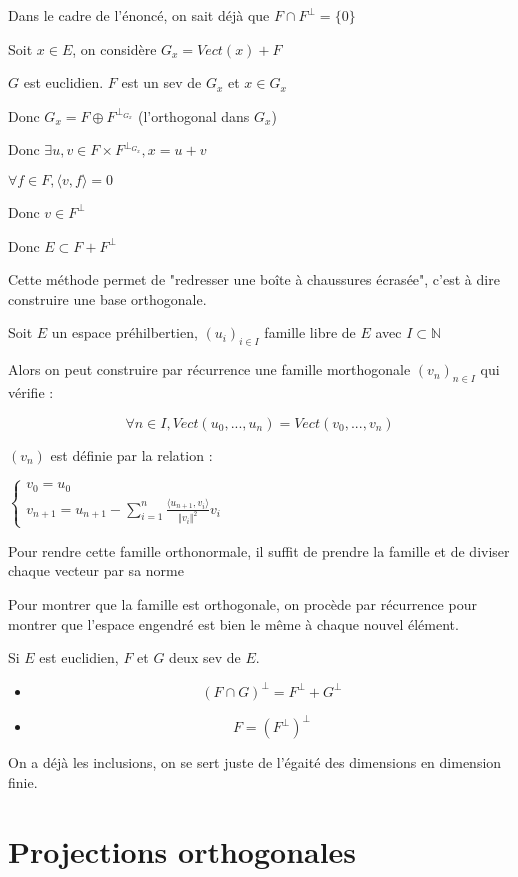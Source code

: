 \documentclass[a4paper,12pt]{book}
\newcommand{\Thr}[2]{\begin{tcolorbox}[sharp corners, colback=white,colframe=red!90!black!75, title=Théorème : #1]#2\end{tcolorbox}}
\newcommand{\Prop}[2]{\begin{tcolorbox}[sharp corners, colback=white,colframe=red!90!black!75, title=Proposition : #1]#2\end{tcolorbox}}
\newcommand{\Pre}[1]{\begin{tcolorbox}[sharp corners, colback=white,colframe=green!60!green!30!black!75, title=Preuve]#1\end{tcolorbox}}
\def\N{\mathbb{N}}
\begin{document}
\Pre{Dans le cadre de l'énoncé, on sait déjà que $F\cap F^\perp = \{0\}$
\par Soit $x\in E$, on considère $G_x = Vect(x)+F$
\par $G$ est euclidien. $F$ est un sev de $G_x$ et $x\in G_x$
\par Donc $G_x = F\oplus F^{\perp_{G_x}}$ (l'orthogonal dans $G_x$)
\par Donc $\exists u, v\in F\times F^{\perp_{G_x}}, x = u+v$
\par $\forall f\in F, \langle v, f\rangle = 0$
\par Donc $v\in F^\perp$
\par Donc $E\subset F+F^\perp$}
\Thr{Méthode de Schmidt}{Cette méthode permet de "redresser une boîte à chaussures écrasée", c'est à dire construire une base orthogonale.
\par Soit $E$ un espace préhilbertien, $(u_i)_{i\in I}$ famille libre de $E$ avec $I\subset \N$
\par Alors on peut construire par récurrence une famille morthogonale $(v_n)_{n\in I}$ qui vérifie :
\par $$\forall n\in I, Vect(u_0,..., u_n) =Vect(v_0,..., v_n)$$
\par $(v_n)$ est définie par la relation :
\par $\begin{cases} v_0 = u_0 \\ v_{n+1} = u_{n+1} - \sum\limits_{i=1}^n\frac{\langle u_{n+1}, v_i\rangle}{\Vert v_i\Vert^2}v_i \end{cases}$
\par Pour rendre cette famille orthonormale, il suffit de prendre la famille et de diviser chaque vecteur par sa norme}
\Pre{Pour montrer que la famille est orthogonale, on procède par récurrence pour montrer que l'espace engendré est bien le même à chaque nouvel élément.}

\Prop{}{Si $E$ est euclidien, $F$ et $G$ deux sev de $E$.\begin{itemize}
\item $$(F\cap G)^\perp = F^\perp + G^\perp$$
\item $$ F = (F^\perp)^\perp$$
\end{itemize}}
\Pre{On a déjà les inclusions, on se sert juste de l'égaité des dimensions en dimension finie.}

\section{Projections orthogonales}
\end{document}
